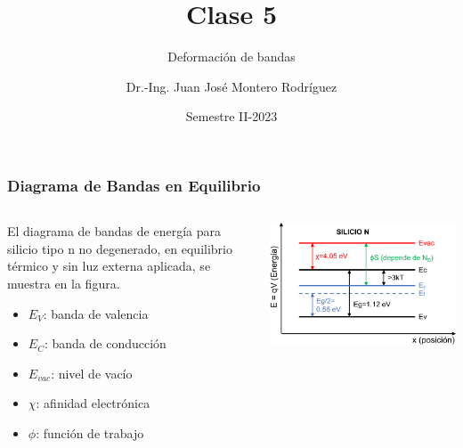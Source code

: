 \documentclass[10pt,t,aspectratio=169]{beamer}
\title{Clase 5}
\subtitle{Deformación de bandas}
\author{Dr.-Ing. Juan José Montero Rodríguez}
\institute{Escuela de Ingeniería Electrónica}
\date{Semestre II-2023}
\begin{document}
\begin{frame}[t]
\titlepage
\end{frame}



\begin{frame}[t]
    \frametitle{Diagrama de Bandas en Equilibrio}

    \begin{columns}
    
        \begin{column}{0.5\textwidth}
        
            El diagrama de bandas de energía para silicio tipo n no degenerado, en equilibrio térmico y sin luz externa aplicada, se muestra en la figura.

            \vspace{3mm}
            \begin{itemize}
                \item $E_V$: banda de valencia
                \item $E_C$: banda de conducción
                \item $E_{vac}$: nivel de vacío
                \item $\chi$: afinidad electrónica
                \item $\phi$: función de trabajo
            \end{itemize}
            
        \end{column}
        
        \begin{column}{0.5\textwidth}
        
            \centering
            \includegraphics[width=\textwidth]{./figures/bandas-equilibrio.pdf}
            

\end{column}
\end{columns}
\end{frame}
\end{document}
